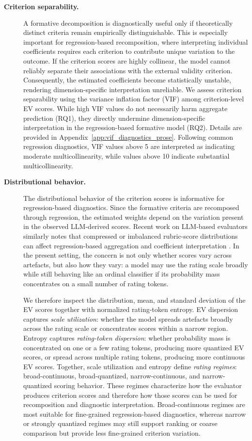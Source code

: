 \begin{description}

    \item[\textbf{Criterion separability.}]
    A formative decomposition is diagnostically useful only if theoretically distinct criteria remain empirically distinguishable. This is especially important for regression-based recomposition, where interpreting individual coefficients requires each criterion to contribute unique variation to the outcome. If the criterion scores are highly collinear, the model cannot reliably separate their associations with the external validity criterion. Consequently, the estimated coefficients become statistically unstable, rendering dimension-specific interpretation unreliable. We assess criterion separability using the variance inflation factor (VIF) among criterion-level EV scores. While high VIF values do not necessarily harm aggregate prediction (RQ1), they directly undermine dimension-specific interpretation in the regression-based formative model (RQ2). Details are provided in Appendix~\ref{app:vif_diagnostics_prose}. Following common regression diagnostics, VIF values above 5 are interpreted as indicating moderate multicollinearity, while values above 10 indicate substantial multicollinearity.

    \item[\textbf{Distributional behavior.}]
    The distributional behavior of the criterion scores is informative for regression-based diagnostics. Since the formative criteria are recomposed through regression, the estimated weights depend on the variation present in the observed LLM-derived scores. Recent work on LLM-based evaluators similarly notes that compressed or imbalanced rubric-score distributions can affect regression-based aggregation and coefficient interpretation \citep{bang_transforming_2025}. In the present setting, the concern is not only whether scores vary across artefacts, but also how they vary: a model may use the rating scale broadly while still behaving like an ordinal classifier if its probability mass concentrates on a small number of rating tokens.

    We therefore inspect the distribution, mean, and standard deviation of the EV scores together with normalized rating-token entropy. EV dispersion captures \textit{scale utilization}: whether the model spreads artefacts broadly across the rating scale or concentrates scores within a narrow region. Entropy captures \textit{rating-token dispersion}: whether probability mass is concentrated on one or a few rating tokens, producing more quantized EV scores, or spread across multiple rating tokens, producing more continuous EV scores. Together, scale utilization and entropy define \textit{rating regimes}: broad-continuous, broad-quantized, narrow-continuous, and narrow-quantized scoring behavior. These regimes characterize how the evaluator produces criterion scores and therefore how those scores can be used for recomposition and diagnostic interpretation. Broad-continuous regimes are most suitable for fine-grained regression-based diagnostics, whereas narrow or strongly quantized regimes may still support ranking or coarse comparison but provide less fine-grained criterion variation.
    

\end{description}
